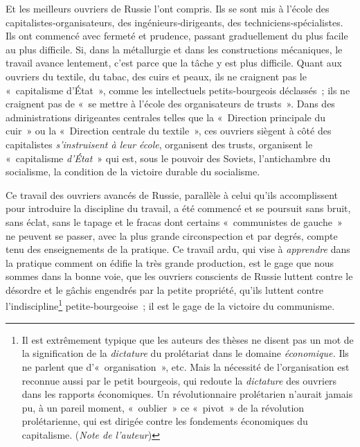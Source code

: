 \documentclass[french,twoside]{book} %
\def\mednobreak{\ifdim\lastskip<\medskipamount
  \removelastskip\nopagebreak\medskip\fi}
\newcommand{\labelblock}[1]{\medbreak{\noindent\color{rubric}\bfseries #1}\par\mednobreak}
\begin{document}
Et les meilleurs ouvriers de Russie l’ont compris. Ils se sont mis à l’école des capitalistes‑organisateurs, des ingénieurs‑dirigeants, des techniciens‑spécialistes. Ils ont commencé avec fermeté et prudence, passant graduellement du plus facile au plus difficile. Si, dans la métallurgie et dans les constructions mécaniques, le travail avance lentement, c’est parce que la tâche y est plus difficile. Quant aux ouvriers du textile, du tabac, des cuirs et peaux, ils ne craignent pas le « capitalisme d’État », comme les intellectuels petits‑bourgeois déclassés ; ils ne craignent pas de « se mettre à l’école des organisateurs de trusts ». Dans des administrations dirigeantes centrales telles que la « Direction principale du cuir » ou la « Direction centrale du textile », ces ouvriers siègent à côté des capitalistes \emph{s’instruisent à leur école}, organisent des trusts, organisent le « capitalisme\emph{ d’État} » qui est, sous le pouvoir des Soviets, l’antichambre du socialisme, la condition de la victoire durable du socialisme.\par
\bigbreak
\noindent Ce travail des ouvriers avancés de Russie, parallèle à celui qu’ils accomplissent pour introduire la discipline du travail, a été commencé et se poursuit sans bruit, sans éclat, sans le tapage et le fracas dont certains « communistes de gauche » ne peuvent se passer, avec la plus grande circonspection et par degrés, compte tenu des enseignements de la pratique. Ce travail ardu, qui vise à \emph{apprendre} dans la pratique comment on édifie la très grande production, est le gage que nous sommes dans la bonne voie, que les ouvriers conscients de Russie luttent contre le désordre et le gâchis engendrés par la petite propriété, qu’ils luttent contre l’indiscipline\footnote{Il est extrêmement typique que les auteurs des thèses ne disent pas un mot de la signification de la \emph{dictature} du prolétariat dans le domaine \emph{économique.} Ils ne parlent que d’« organisation », etc. Mais la nécessité de l’organisation est reconnue aussi par le petit bourgeois, qui redoute la \emph{dictature} des ouvriers dans les rapports économiques. Un révolutionnaire prolétarien n’aurait jamais pu, à un pareil moment, « oublier » ce « pivot » de la révolution prolétarienne, qui est dirigée contre les fondements économiques du capitalisme. (\emph{Note de l’auteur})} petite‑bourgeoise ; il est le gage de la victoire du communisme.\par

\labelblock{Deux remarques pour conclure.}
\end{document}
